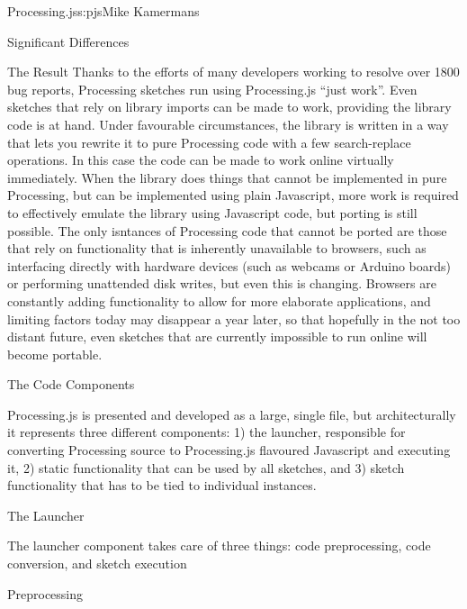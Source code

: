 \begin{aosachapter}{Processing.js}{s:pjs}{Mike Kamermans}
\begin{aosasect1}{Significant Differences}
\begin{aosasect2}{The Result}
Thanks to the efforts of many developers working to resolve over 1800
bug reports, Processing sketches run using Processing.js ``just
work''. Even sketches that rely on library imports can be made to work,
providing the library code is at hand. Under favourable circumstances,
the library is written in a way that lets you rewrite it to pure
Processing code with a few search-replace operations. In this case the
code can be made to work online virtually immediately. When the
library does things that cannot be implemented in pure Processing, but
can be implemented using plain Javascript, more work is required to
effectively emulate the library using Javascript code, but porting is
still possible. The only isntances of Processing code that cannot be
ported are those that rely on functionality that is inherently
unavailable to browsers, such as interfacing directly with hardware
devices (such as webcams or Arduino boards) or performing unattended
disk writes, but even this is changing. Browsers are constantly adding
functionality to allow for more elaborate applications, and limiting
factors today may disappear a year later, so that hopefully in the not
too distant future, even sketches that are currently impossible to run
online will become portable.

\end{aosasect2}

\end{aosasect1}

\begin{aosasect1}{The Code Components}

Processing.js is presented and developed as a large, single file, but
architecturally it represents three different components: 1) the
launcher, responsible for converting Processing source to
Processing.js flavoured Javascript and executing it, 2) static
functionality that can be used by all sketches, and 3) sketch
functionality that has to be tied to individual instances.

\begin{aosasect2}{The Launcher}

The launcher component takes care of three things: code preprocessing,
code conversion, and sketch execution

\begin{aosasect3}{Preprocessing}


\end{aosasect3}
\end{aosasect2}
\end{aosasect1}
\end{aosachapter}
